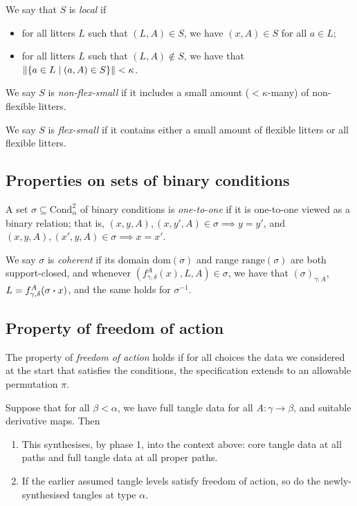 \documentclass[a4paper]{article}
\begin{document}
We say that \( S \) is \textit{local} if
\begin{itemize}
  \item for all litters \( L \) such that \( (L,A) \in S \), we have \( (x,A) \in S \) for all \( a \in L \);
  \item for all litters \( L \) such that \( (L,A) \not\in S \), we have that \( \norm{\qty{a \in L \mid (a,A) \in S}} < \kappa \).
\end{itemize}

We say \( S \) is \textit{non-flex-small} if it includes a small amount (\( < \kappa \)-many) of non-flexible litters.

We say \( S \) is \textit{flex-small} if it contains either a small amount of flexible litters or all flexible litters.

\subsection{Properties on sets of binary conditions}
A set \( \sigma \subseteq \mathrm{Cond}^2_\alpha \) of binary conditions is \textit{one-to-one} if it is one-to-one viewed as a binary relation; that is, \( (x,y,A), (x,y',A) \in \sigma \implies y = y' \), and \( (x,y,A),(x',y,A) \in \sigma \implies x = x' \).

We say \( \sigma \) is \textit{coherent} if its domain \( \mathrm{dom}(\sigma) \) and range \( \mathrm{range}(\sigma) \) are both support-closed, and whenever \( (f^A_{\gamma,\delta}(x),L,A) \in \sigma \), we have that \( (\sigma)_{\gamma:A} \), \( L = f^A_{\gamma,\delta}(\sigma \vdot x) \), and the same holds for \( \sigma^{-1} \).

\subsection{Property of freedom of action}
The property of \textit{freedom of action} holds if for all choices the data we considered at the start that satisfies the conditions, the specification extends to an allowable permutation \( \pi \).
\begin{theorem}
  Suppose that for all \( \beta < \alpha \), we have full tangle data for all \( A \colon \gamma \to \beta \), and suitable derivative maps.
  Then
  \begin{enumerate}
    \item This synthesises, by phase 1, into the context above: core tangle data at all paths and full tangle data at all proper paths.
    \item If the earlier assumed tangle levels satisfy freedom of action, so do the newly-synthesised tangles at type \( \alpha \).
  \end{enumerate}
\end{theorem}
\end{document}
